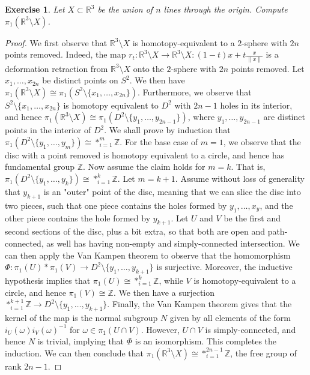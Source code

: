 \documentclass{article}
\newtheorem{exercise}{Exercise}[subsection]
\begin{document}
\begin{exercise}
Let $X\subset\mathbb{R}^3$ be the union of $n$ lines through the origin. Compute $\pi_1(\mathbb{R}^3\setminus X)$.
\end{exercise}
\begin{proof}
We first observe that $\mathbb{R}^3\setminus X$ is homotopy-equivalent to a $2$-sphere with $2n$ points removed. Indeed, the map $r_t:\mathbb{R}^3\setminus X\to \mathbb{R}^3\setminus X:(1-t)x+t\frac{x}{\|x\|}$ is a deformation retraction from $\mathbb{R}^3\setminus X$ onto the $2$-sphere with $2n$ points removed. Let $x_1,\dots,x_{2n}$ be distinct points on $S^2$. We then have $\pi_1(\mathbb{R}^3\setminus X)\cong\pi_1(S^2\setminus\{x_1,\dots,x_{2n}\})$. Furthermore, we observe that $S^2\setminus\{x_1,\dots,x_{2n}\}$ is homotopy equivalent to $D^2$ with $2n-1$ holes in its interior, and hence $\pi_1(\mathbb{R}^3\setminus X)\cong\pi_1(D^2\setminus\{y_1,\dots,y_{2n-1}\})$, where $y_1,\dots, y_{2n-1}$ are distinct points in the interior of $D^2$. We shall prove by induction that $\pi_1(D^2\setminus\{y_1,\dots,y_m\})\cong *_{i=1}^m\mathbb{Z}$. For the base case of $m=1$, we observe that the disc with a point removed is homotopy equivalent to a circle, and hence has fundamental group $\mathbb{Z}$. Now assume the claim holds for $m=k$. That is, $\pi_1(D^2\setminus\{y_1,\dots,y_k\})\cong *_{i=1}^k\mathbb{Z}$. Let $m=k+1$. Assume without loss of generality that $y_{k+1}$ is an "outer" point of the disc, meaning that we can slice the disc into two pieces, such that one piece contains the holes formed by $y_1,\dots, x_y$, and the other piece contains the hole formed by $y_{k+1}$. Let $U$ and $V$ be the first and second sections of the disc, plus a bit extra, so that both are open and path-connected, as well has having non-empty and simply-connected intersection. We can then apply the Van Kampen theorem to observe that the homomorphism $\Phi:\pi_1(U)*\pi_1(V)\to D^2\setminus\{y_1,\dots,y_{k+1}\}$ is surjective. Moreover, the inductive hypothesis implies that $\pi_1(U)\cong *_{i=1}^k\mathbb{Z}$, while $V$ is homotopy-equivalent to a circle, and hence $\pi_1(V)\cong\mathbb{Z}$. We then have a surjection $*_{i=1}^{k+1}\mathbb{Z}\to D^2\setminus\{y_1,\dots,y_{k+1}\}$. Finally, the Van Kampen theorem gives that the kernel of the map is the normal subgroup $N$ given by all elements of the form $i_{U}(\omega)i_V(\omega)^{-1}$ for $\omega\in\pi_1(U\cap V)$. However, $U\cap V$ is simply-connected, and hence $N$ is trivial, implying that $\Phi$ is an isomorphism. This completes the induction. We can then conclude that $\pi_1(\mathbb{R}^3\setminus X)\cong *_{i=1}^{2n-1}\mathbb{Z}$, the free group of rank $2n-1$.
\end{proof}
\end{document}
